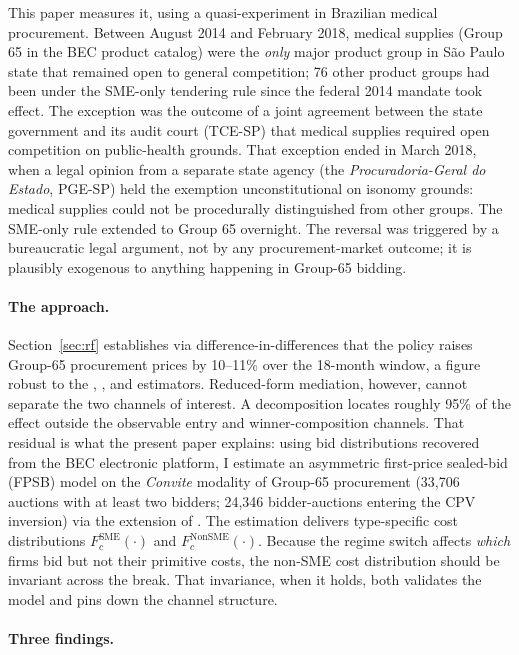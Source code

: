 \documentclass[12pt]{article}
\begin{document}
This paper measures it, using a quasi-experiment in Brazilian medical
procurement. Between August 2014 and February 2018, medical supplies
(Group 65 in the BEC product catalog) were the \emph{only} major
product group in S\~ao Paulo state that remained open to general
competition; 76 other product groups had been under the SME-only
tendering rule since the federal 2014 mandate took effect. The
exception was the outcome of a joint agreement between the state
government and its audit court (TCE-SP) that medical supplies required
open competition on public-health grounds. That exception ended in
March 2018, when a legal opinion from a separate state agency
(the \emph{Procuradoria-Geral do Estado}, PGE-SP) held the exemption
unconstitutional on isonomy grounds: medical supplies could not be
procedurally distinguished from other groups. The SME-only rule
extended to Group 65 overnight. The reversal was triggered by a
bureaucratic legal argument, not by any procurement-market outcome; it
is plausibly exogenous to anything happening in Group-65 bidding.

\paragraph{The approach.}
Section~\ref{sec:rf} establishes via difference-in-differences
that the policy raises Group-65 procurement prices by 10--11\%
over the 18-month window, a figure robust to the
\citet{callaway2021}, \citet{sun2021}, and \citet{goodmanbacon2021}
estimators. Reduced-form mediation, however, cannot separate the
two channels of interest. A \citet{gelbach2016} decomposition locates roughly 95\%
of the effect outside the observable entry and winner-composition
channels. That residual is what the present paper explains: using bid
distributions recovered from the BEC electronic platform, I estimate
an asymmetric first-price sealed-bid (FPSB) model on the \emph{Convite}
modality of Group-65 procurement (33,706 auctions with at least two
bidders; 24,346 bidder-auctions entering the CPV inversion) via the
\citet{campo2003} extension of \citet{gpv2000}. The estimation
delivers type-specific cost distributions
$F_c^{\text{SME}}(\cdot)$ and $F_c^{\text{NonSME}}(\cdot)$.
Because the regime switch affects \emph{which} firms bid but not
their primitive costs, the non-SME cost distribution should be
invariant across the break. That invariance, when it holds, both
validates the model and pins down the channel structure.

\paragraph{Three findings.}
\end{document}
